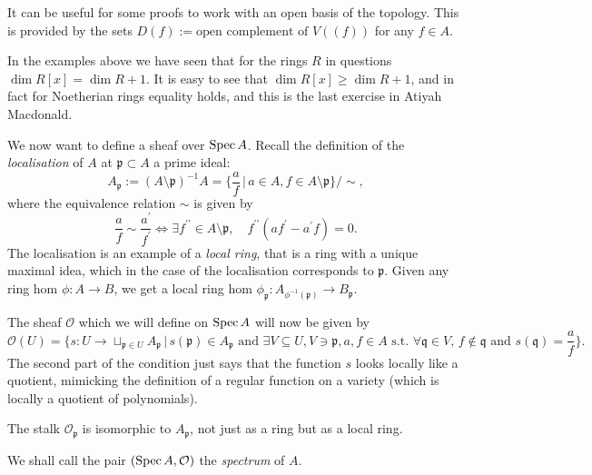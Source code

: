 \documentclass[000-main.tex]{subfiles}
\begin{document}
\begin{remark}
  It can be useful for some proofs to work with an open basis of the topology.
  This is provided by the sets $D(f) := \text{open complement of }V((f))$ for any $f \in A$.
\end{remark}

\begin{remark}
  In the examples above we have seen that for the rings $R$ in questions $\dim R[x] = \dim R + 1$.
  It is easy to see that $\dim R[x] \geq \dim R + 1$, and in fact for Noetherian rings equality holds, and this is the last exercise in Atiyah Macdonald.
\end{remark}

We now want to define a sheaf over $\operatorname{Spec} A$.
Recall the definition of the \emph{localisation} of $A$ at $\mathfrak{p} \subset A$ a prime ideal:
\[
  A_{\mathfrak{p}} := (A\setminus \mathfrak{p})^{-1} A = \lbrace \frac{a}{f} \, | \, a \in A, f \in A\setminus \mathfrak{p} \rbrace / \sim,
\]
where the equivalence relation $\sim$ is given by 
\[
  \frac{a}{f} \sim \frac{a^\prime}{f^\prime} \Leftrightarrow \exists f^{\prime \prime} \in A\setminus \mathfrak{p} , \quad f^{\prime \prime}(a f^\prime - a^\prime f) = 0.
\]
The localisation is an example of a \emph{local ring}, that is a ring with a unique maximal idea, which in the case of the localisation corresponds to $\mathfrak{p}$. Given any ring hom $\phi : A \to B$, we get a local ring hom $\phi_{\mathfrak{p}} : A_{\phi^{-1}(\mathfrak{p})} \to B_{\mathfrak{p}}$. 


The sheaf $\mathcal{O}$ which we will define on $\operatorname{Spec} A$ will now be given by 
\[
  \mathcal{O}(U) = \lbrace s : U \to \sqcup_{\mathfrak{p} \in U} A_{\mathfrak{p}} \, | \, s(\mathfrak{p}) \in A_{\mathfrak{p}} \text{ and } \exists V \subseteq U, V \ni \mathfrak{p}, a, f \in A \text{ s.t. } \forall \mathfrak{q} \in V, \, f \notin \mathfrak{q} \text{ and } s(\mathfrak{q}) = \frac{a}{f} \rbrace.
\]
The second part of the condition just says that the function $s$ looks locally like a quotient, mimicking the definition of a regular function on a variety (which is locally a quotient of polynomials). 

\begin{lemma}
  The stalk $\mathcal{O}_{\mathfrak{p}}$ is isomorphic to $A_{\mathfrak{p}}$, not just as a ring but as a local ring.
\end{lemma}

We shall call the pair $(\operatorname{Spec} A, \mathcal{O})$ the \emph{spectrum} of $A$. 
\end{document}
